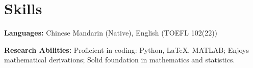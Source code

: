 \section{Skills}
\textbf{Languages:} Chinese Mandarin (Native), English (TOEFL 102(22))\vspace{5pt}

\textbf{Research Abilities:} Proficient in coding: Python, \LaTeX, MATLAB; Enjoys mathematical derivations; Solid foundation in mathematics and statistics.